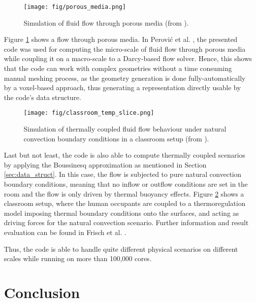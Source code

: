 \documentclass[10pt, conference, compsocconf]{IEEEtran}
\begin{document}
\begin{figure}[ht]
	\centering
		\texttt{[image: fig/porous\_media.png]}
	\caption{Simulation of fluid flow through porous media (from \cite{Perovic2014}).}
	\label{fig:pic_porous_media}
\end{figure}

Figure \ref{fig:pic_porous_media} shows a flow through porous media. In Perovi\'c et al. \cite{Perovic2014}, the presented code was used for computing the micro-scale of fluid flow through porous media while coupling it on a macro-scale to a Darcy-based flow solver. Hence, this shows that the code can work with complex geometries without a time consuming manual meshing process, as the geometry generation is done fully-automatically by a voxel-based approach, thus generating a representation directly usable by the code's data structure.

\begin{figure}[ht]
	\centering
		\texttt{[image: fig/classroom\_temp\_slice.png]}
	\caption{Simulation of thermally coupled fluid flow behaviour under natural convection boundary conditions in a classroom setup (from \cite{Frisch2015Computation}).}
	\label{fig:classroom_natural_ventilation}
\end{figure}

Last but not least, the code is also able to compute thermally coupled scenarios by applying the Boussinesq approximation as mentioned in Section \ref{sec:data_struct}. In this case, the flow is subjected to pure natural convection boundary conditions, meaning that no inflow or outflow conditions are set in the room and the flow is only driven by thermal buoyancy effects. Figure \ref{fig:classroom_natural_ventilation} shows a classroom setup, where the human occupants are coupled to a thermoregulation model imposing thermal boundary conditions onto the surfaces, and acting as driving forces for the natural convection scenario. Further information and result evaluation can be found in Frisch et al. \cite{Frisch2015Computation}.

Thus, the code is able to handle quite different physical scenarios on different scales while running on more than 100,000 cores.

\section{Conclusion}
\end{document}
